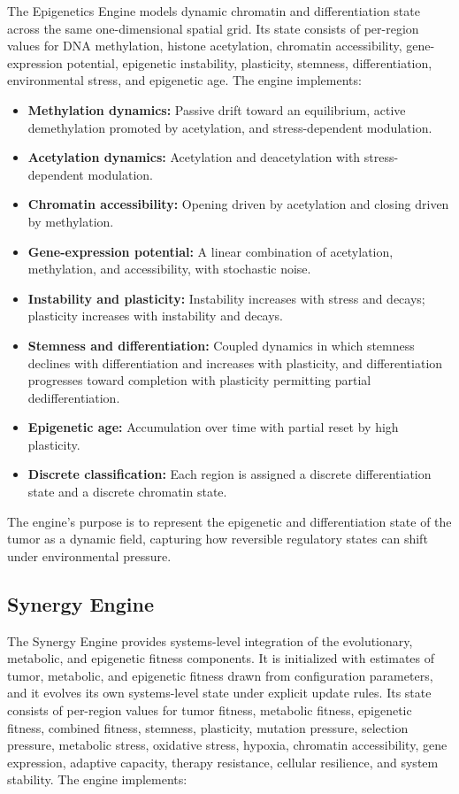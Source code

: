 \documentclass[12pt,a4paper]{article}
\begin{document}
The Epigenetics Engine models dynamic chromatin and differentiation state across the same one-dimensional spatial grid. Its state consists of per-region values for DNA methylation, histone acetylation, chromatin accessibility, gene-expression potential, epigenetic instability, plasticity, stemness, differentiation, environmental stress, and epigenetic age. The engine implements:

\begin{itemize}[leftmargin=*]
    \item \textbf{Methylation dynamics:} Passive drift toward an equilibrium, active demethylation promoted by acetylation, and stress-dependent modulation.
    \item \textbf{Acetylation dynamics:} Acetylation and deacetylation with stress-dependent modulation.
    \item \textbf{Chromatin accessibility:} Opening driven by acetylation and closing driven by methylation.
    \item \textbf{Gene-expression potential:} A linear combination of acetylation, methylation, and accessibility, with stochastic noise.
    \item \textbf{Instability and plasticity:} Instability increases with stress and decays; plasticity increases with instability and decays.
    \item \textbf{Stemness and differentiation:} Coupled dynamics in which stemness declines with differentiation and increases with plasticity, and differentiation progresses toward completion with plasticity permitting partial dedifferentiation.
    \item \textbf{Epigenetic age:} Accumulation over time with partial reset by high plasticity.
    \item \textbf{Discrete classification:} Each region is assigned a discrete differentiation state and a discrete chromatin state.
\end{itemize}

The engine's purpose is to represent the epigenetic and differentiation state of the tumor as a dynamic field, capturing how reversible regulatory states can shift under environmental pressure.

\subsection{Synergy Engine}

The Synergy Engine provides systems-level integration of the evolutionary, metabolic, and epigenetic fitness components. It is initialized with estimates of tumor, metabolic, and epigenetic fitness drawn from configuration parameters, and it evolves its own systems-level state under explicit update rules. Its state consists of per-region values for tumor fitness, metabolic fitness, epigenetic fitness, combined fitness, stemness, plasticity, mutation pressure, selection pressure, metabolic stress, oxidative stress, hypoxia, chromatin accessibility, gene expression, adaptive capacity, therapy resistance, cellular resilience, and system stability. The engine implements:
\end{document}
